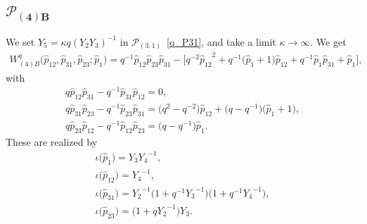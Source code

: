 \documentclass[pdftex]{sigma}
\numberwithin{equation}{section}
\begin{document}
\subsection[$\mathcal{P}_{(4)B}$]{$\boldsymbol{\mathcal{P}_{(4)B}}$}
We set $Y_5 = \kappa q (Y_2 Y_3)^{-1}$ in $\mathcal{P}_{(3,1)}$~\eqref{q_P31}, and take a limit $\kappa\to\infty$. We get
\begin{gather*}
 W^q_{(4)B}\big( \hat{p}_{12}, \hat{p}_{31}, \hat{p}_{23}; \hat{p}_1 \big) = q^{-1} \hat{p}_{12} \hat{p}_{23} \hat{p}_{31} - \big[ q^{-2} {\hat{p}_{12}}^{2} + q^{-1}\big( \hat{p}_1 +1\big) \hat{p}_{12}
 + q^{-1} \hat{p}_1 \hat{p}_{31} + \hat{p}_1\big],
\end{gather*}
with
\begin{gather*}
 q \hat{p}_{12} \hat{p}_{31} - q^{-1} \hat{p}_{31} \hat{p}_{12} = 0, \\
 q \hat{p}_{31} \hat{p}_{23} - q^{-1} \hat{p}_{23} \hat{p}_{31} = \big(q^2 - q^{-2}\big) \hat{p}_{12} + \big( q- q^{-1}\big)\big( \hat{p}_1 + 1\big) , \\
 q \hat{p}_{23} \hat{p}_{12} - q^{-1} \hat{p}_{12} \hat{p}_{23} = \big( q - q^{-1}\big) \hat{p}_1 .
\end{gather*}
These are realized by
\begin{gather*}
 \iota\big(\hat{p}_1\big) = Y_3 {Y_4}^{-1} , \\
\iota\big(\hat{p}_{12}\big) = {Y_4}^{-1} , \\
 \iota\big(\hat{p}_{31}\big) = {Y_2}^{-1}\big( 1 + q^{-1} {Y_3}^{-1}\big)\big( 1 + q^{-1} {Y_4}^{-1}\big) , \\
\iota\big(\hat{p}_{23}\big) = \big( 1 + q {Y_2}^{-1}\big) {Y_3} .
\end{gather*}
\end{document}
